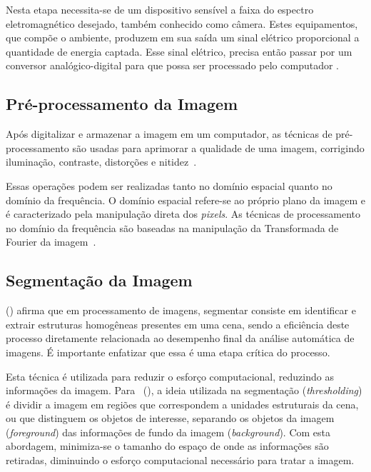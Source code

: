 Nesta etapa necessita-se de um dispositivo sensível a faixa do espectro eletromagnético desejado, também conhecido como câmera. Estes equipamentos, que compõe o ambiente, produzem em sua saída um sinal elétrico proporcional a quantidade de energia captada. Esse sinal elétrico, precisa então passar por um conversor analógico-digital para que possa ser processado pelo computador \cite{rogeralex1999}.

\subsection{Pré-processamento da Imagem}
\label{subsec:preProcImagem}

Após digitalizar e armazenar a imagem em um computador, as técnicas de pré-processamento são usadas para aprimorar a qualidade de uma imagem, corrigindo iluminação, contraste, distorções e nitidez~\cite{rudek2001visao}.

Essas operações podem ser realizadas tanto no domínio espacial quanto no domínio da frequência. O domínio espacial refere-se ao próprio plano da imagem e é caracterizado pela manipulação direta dos \textit{pixels}. As técnicas de processamento no domínio da frequência são baseadas na manipulação da Transformada de Fourier da imagem~\cite{rogeralex1999}.

\subsection{Segmentação da Imagem}
\label{subsec:segImagem}

\citeauthor{heinen2004navegaccao} (\citeyear{heinen2004navegaccao}) afirma que em processamento de imagens, segmentar consiste em identificar e extrair estruturas homogêneas presentes em uma cena, sendo a eficiência deste processo diretamente relacionada ao desempenho final da análise automática de imagens. É importante enfatizar que essa é uma etapa crítica do processo.

Esta técnica é utilizada para reduzir o esforço computacional, reduzindo as informações da imagem. Para~\citeauthor{rudek2001visao} (\citeyear{rudek2001visao}), a ideia utilizada na segmentação (\textit{thresholding}) é dividir a imagem em regiões que correspondem a unidades estruturais da cena, ou que distinguem os objetos de interesse, separando os objetos da imagem (\textit{foreground}) das informações de fundo da imagem (\textit{background}). Com esta abordagem, minimiza-se o tamanho do espaço de onde as informações são retiradas, diminuindo o esforço computacional necessário para tratar a imagem.

